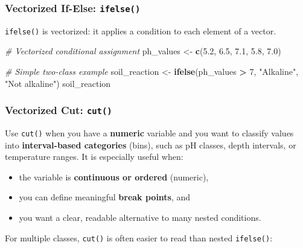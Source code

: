 \documentclass[
  10pt,
  b5paper,
  oneside]{book}
\newenvironment{Shaded}{\begin{snugshade}}{\end{snugshade}}
\newcommand{\CommentTok}[1]{\textcolor[rgb]{0.56,0.35,0.01}{\textit{#1}}}
\newcommand{\DecValTok}[1]{\textcolor[rgb]{0.00,0.00,0.81}{#1}}
\newcommand{\FloatTok}[1]{\textcolor[rgb]{0.00,0.00,0.81}{#1}}
\newcommand{\FunctionTok}[1]{\textcolor[rgb]{0.13,0.29,0.53}{\textbf{#1}}}
\newcommand{\NormalTok}[1]{#1}
\newcommand{\OtherTok}[1]{\textcolor[rgb]{0.56,0.35,0.01}{#1}}
\newcommand{\SpecialCharTok}[1]{\textcolor[rgb]{0.81,0.36,0.00}{\textbf{#1}}}
\newcommand{\StringTok}[1]{\textcolor[rgb]{0.31,0.60,0.02}{#1}}
\providecommand{\tightlist}{%
  \setlength{\itemsep}{0pt}\setlength{\parskip}{0pt}}
\begin{document}
\subsubsection{\texorpdfstring{Vectorized If-Else: \texttt{ifelse()}}{Vectorized If-Else: ifelse()}}\label{v-ifelse-statements}

\texttt{ifelse()} is vectorized: it applies a condition to each element of a vector.

\begin{Shaded}
\begin{Highlighting}[]
\CommentTok{\# Vectorized conditional assignment}
\NormalTok{ph\_values }\OtherTok{\textless{}{-}} \FunctionTok{c}\NormalTok{(}\FloatTok{5.2}\NormalTok{, }\FloatTok{6.5}\NormalTok{, }\FloatTok{7.1}\NormalTok{, }\FloatTok{5.8}\NormalTok{, }\FloatTok{7.0}\NormalTok{)}

\CommentTok{\# Simple two{-}class example}
\NormalTok{soil\_reaction }\OtherTok{\textless{}{-}} \FunctionTok{ifelse}\NormalTok{(ph\_values }\SpecialCharTok{\textgreater{}} \DecValTok{7}\NormalTok{, }\StringTok{"Alkaline"}\NormalTok{, }\StringTok{"Not alkaline"}\NormalTok{)}
\NormalTok{soil\_reaction}
\end{Highlighting}
\end{Shaded}

\subsubsection{\texorpdfstring{Vectorized Cut: \texttt{cut()}}{Vectorized Cut: cut()}}\label{cut-statements}

Use \texttt{cut()} when you have a \textbf{numeric} variable and you want to classify values into \textbf{interval-based categories} (bins), such as pH classes, depth intervals, or temperature ranges. It is especially useful when:

\begin{itemize}
\tightlist
\item
  the variable is \textbf{continuous or ordered} (numeric),
\item
  you can define meaningful \textbf{break points}, and
\item
  you want a clear, readable alternative to many nested conditions.
\end{itemize}

For multiple classes, \texttt{cut()} is often easier to read than nested \texttt{ifelse()}:
\end{document}
